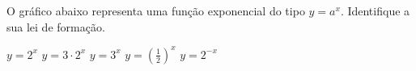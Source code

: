 O gráfico abaixo representa uma função exponencial do tipo $y=a^x$. Identifique a sua lei de formação.

\parbox{0.38\linewidth}{

$y=2^x$
$y=3\cdot 2^x$
$y=3^x$
$y=\left(\frac{1}{2}\right)^x$
$y=2^{-x}$

}\parbox{0.62\linewidth}{
}

